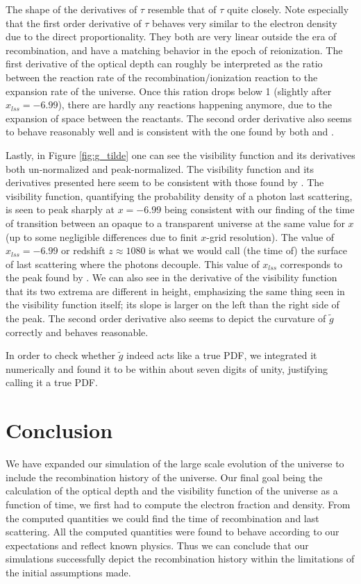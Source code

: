 \documentclass[twocolumn]{aastex62}
\begin{document}
The shape of the derivatives of $\tau$ resemble that of $\tau$ quite closely. Note especially that the first order derivative of $\tau$ behaves very similar to the electron density due to the direct proportionality. They both are very linear outside the era of recombination, and have a matching behavior in the epoch of reionization. The first derivative of the optical depth can roughly be interpreted as the ratio between the reaction rate of the recombination/ionization reaction to the expansion rate of the universe. Once this ration drops below 1 (slightly after $x_{lss} = -6.99$), there are hardly any reactions happening anymore, due to the expansion of space between the reactants. The second order derivative also seems to behave reasonably well and is consistent with the one found by both \cite{callin:2006} and \cite{winther:2020}.  

Lastly, in Figure \ref{fig:g_tilde} one can see the visibility function and its derivatives both un-normalized and peak-normalized. The visibility function and its derivatives presented here seem to be consistent with those found by \cite{callin:2006}. The visibility function, quantifying the probability density of a photon last scattering, is seen to peak sharply at $x = -6.99$ being consistent with our finding of the time of transition between an opaque to a transparent universe at the same value for $x$ (up to some negligible differences due to finit $x$-grid resolution). The value of $x_{lss} = -6.99$ or redshift $z \approx 1080$ is what we would call (the time of) the surface of last scattering where the photons decouple. This value of $x_{lss}$ corresponds to the peak found by \cite{callin:2006}. We can also see in the derivative of the visibility function that its two extrema are different in height, emphasizing the same thing seen in the visibility function itself; its slope is larger on the left than the right side of the peak. The second order derivative also seems to depict the curvature of $\tilde{g}$ correctly and behaves reasonable. 

In order to check whether $\tilde{g}$ indeed acts like a true PDF, we integrated it numerically and found it to be within about seven digits of unity, justifying calling it a true PDF.

\section{Conclusion} \label{sec:Conclusion}
We have expanded our simulation of the large scale evolution of the universe to include the recombination history of the universe. Our final goal being the calculation of the optical depth and the visibility function of the universe as a function of time, we first had to compute the electron fraction and density. From the computed quantities we could find the time of recombination and last scattering. All the computed quantities were found to behave according to our expectations and reflect known physics. Thus we can conclude that our simulations successfully depict the recombination history within the limitations of the initial assumptions made.
\newpage


\end{document}

